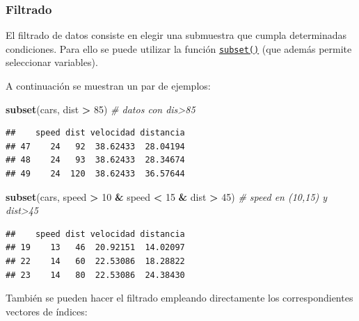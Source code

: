 \documentclass[
]{book}
\newenvironment{Shaded}{\begin{snugshade}}{\end{snugshade}}
\newcommand{\CommentTok}[1]{\textcolor[rgb]{0.56,0.35,0.01}{\textit{#1}}}
\newcommand{\DecValTok}[1]{\textcolor[rgb]{0.00,0.00,0.81}{#1}}
\newcommand{\KeywordTok}[1]{\textcolor[rgb]{0.13,0.29,0.53}{\textbf{#1}}}
\newcommand{\NormalTok}[1]{#1}
\newcommand{\OperatorTok}[1]{\textcolor[rgb]{0.81,0.36,0.00}{\textbf{#1}}}
\newcommand{\StringTok}[1]{\textcolor[rgb]{0.31,0.60,0.02}{#1}}
\begin{document}
\hypertarget{filtrado}{%
\subsubsection{Filtrado}\label{filtrado}}

El filtrado de datos consiste en
elegir una submuestra que cumpla determinadas condiciones. Para ello se
puede utilizar la función \href{https://www.rdocumentation.org/packages/base/versions/3.6.1/topics/subset}{\texttt{subset()}}
(que además permite seleccionar variables).

A continuación se muestran un par de ejemplos:

\begin{Shaded}
\begin{Highlighting}[]
\KeywordTok{subset}\NormalTok{(cars, dist }\OperatorTok{>}\StringTok{ }\DecValTok{85}\NormalTok{) }\CommentTok{# datos con dis>85}
\end{Highlighting}
\end{Shaded}

\begin{verbatim}
##    speed dist velocidad distancia
## 47    24   92  38.62433  28.04194
## 48    24   93  38.62433  28.34674
## 49    24  120  38.62433  36.57644
\end{verbatim}

\begin{Shaded}
\begin{Highlighting}[]
\KeywordTok{subset}\NormalTok{(cars, speed }\OperatorTok{>}\StringTok{ }\DecValTok{10} \OperatorTok{&}\StringTok{ }\NormalTok{speed }\OperatorTok{<}\StringTok{ }\DecValTok{15} \OperatorTok{&}\StringTok{ }\NormalTok{dist }\OperatorTok{>}\StringTok{ }\DecValTok{45}\NormalTok{) }\CommentTok{# speed en (10,15) y dist>45}
\end{Highlighting}
\end{Shaded}

\begin{verbatim}
##    speed dist velocidad distancia
## 19    13   46  20.92151  14.02097
## 22    14   60  22.53086  18.28822
## 23    14   80  22.53086  24.38430
\end{verbatim}

También se pueden hacer el filtrado empleando directamente los
correspondientes vectores de índices:

\begin{Shaded}
\end{Shaded}
\end{document}
